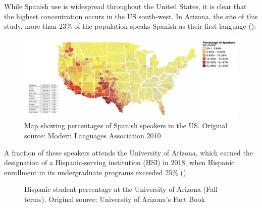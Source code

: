 \documentclass[output=paper]{../langscibook}
\begin{document}
While Spanish use is widespread throughout the United States, it is clear that the highest concentration occurs in the US south-west. In Arizona, the site of this study, more than 23\% of the population speaks Spanish as their first language ():

\begin{figure}
  \includegraphics[width=\textwidth]{figures/Chapter3-img003.png}
  \caption{Map showing percentages of Spanish speakers in the US. Original source: Modern Languages Association 2010\label{fig:3:3}}
\end{figure}


A fraction of these speakers attends the University of Arizona, which earned the designation of a Hispanic-serving institution (HSI) in 2018, when Hispanic enrollment in its undergraduate programs exceeded 25\% ().

  
 

\begin{figure}
\footnotesize
  \caption{Hispanic student percentage at the University of Arizona (Fall terms). Original source: University of Arizona's Fact Book}
    \label{fig:3:4}
\end{figure}
\end{document}
